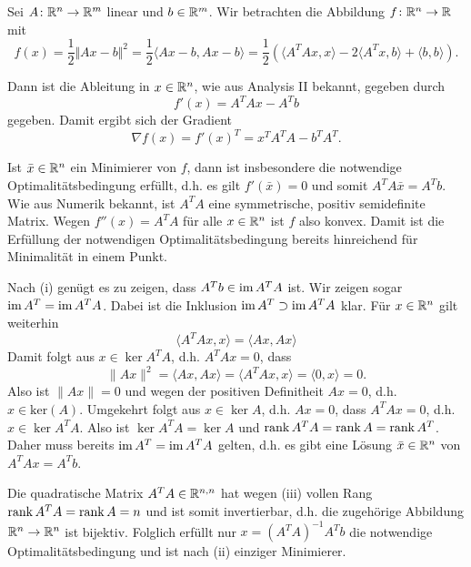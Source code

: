Sei $A\colon \mathbb{R}^n\to\mathbb{R}^m$ linear und $b\in\mathbb{R}^m$. Wir betrachten die Abbildung $f\colon \mathbb{R}^n\to\mathbb{R}$ mit
\begin{displaymath}
 f(x)=\frac{1}{2}\Vert Ax-b\Vert^2=\frac{1}{2}\langle Ax-b,Ax-b\rangle=\frac{1}{2}(\langle A^TAx,x\rangle-2\langle A^Tx,b\rangle+\langle b,b\rangle).
\end{displaymath}
\begin{compactenum}[(i)]
 \item Dann ist die Ableitung in $x\in\mathbb{R}^n$, wie aus Analysis II bekannt, gegeben durch
 \begin{displaymath}
 f'(x)=  A^TAx- A^Tb
 \end{displaymath}
 gegeben. Damit ergibt sich der Gradient
 \begin{displaymath}
  \nabla f(x) = f'(x)^T= x^TA^TA-b^TA^T.
 \end{displaymath}
 \item Ist $\bar x\in\mathbb{R}^n$ ein Minimierer von $f$, dann ist insbesondere die notwendige Optimalitätsbedingung erfüllt, d.h. es gilt $f'(\bar x)=0$
 und somit $A^TA\bar x=A^Tb$. Wie aus Numerik bekannt, ist $A^TA$ eine symmetrische, positiv semidefinite Matrix. Wegen $f''(x)=A^TA$ für alle $x\in\mathbb{R}^n$ ist $f$ also konvex.
 Damit ist die Erfüllung der notwendigen Optimalitätsbedingung bereits hinreichend für Minimalität in einem Punkt.\\
 \item Nach (i) genügt es zu zeigen, dass $A^Tb\in\operatorname{im} A^TA$ ist. Wir zeigen sogar $\operatorname{im} A^T = \operatorname{im} A^TA$. Dabei ist die Inklusion $\operatorname{im} A^T \supset \operatorname{im} A^TA$ klar. Für $x\in\mathbb{R}^n$
 gilt weiterhin
 \begin{displaymath}
  \langle A^TAx,x\rangle=\langle Ax, Ax\rangle
 \end{displaymath}
Damit folgt aus $x\in\ker A^TA$, d.h. $A^TAx=0$, dass
$$\|Ax\|^2=\langle Ax,Ax \rangle=\langle A^TAx,x \rangle=\langle 0,x \rangle=0.$$
Also ist $\|Ax\|=0$ und wegen der positiven Definitheit $Ax=0$, d.h. $x\in\text{ker}(A)$. Umgekehrt folgt aus $x\in\ker A$, d.h. $Ax=0$, dass $A^TAx=0$, d.h. $x\in\ker A^TA$. Also ist $\ker A^TA=\ker A$ und $  \operatorname{rank} A^T A=\operatorname{rank} A=\operatorname{rank} A^T$.  Daher muss bereits $\operatorname{im} A^T = \operatorname{im} A^TA$ gelten, d.h. es gibt eine Lösung $\bar x\in\mathbb{R}^n$ von $A^TAx=A^Tb$.\\
 \item Die quadratische Matrix $A^TA\in \mathbb{R}^{n,n}$ hat wegen (iii) vollen Rang $\operatorname{rank} A^TA=\operatorname{rank} A=n$ und ist somit invertierbar, d.h. die zugehörige Abbildung $\mathbb{R}^n\to\mathbb{R}^n$ ist bijektiv. Folglich erfüllt nur $x=(A^TA)^{-1}A^Tb$ die notwendige Optimalitätsbedingung und ist nach (ii) einziger Minimierer.
\end{compactenum}
